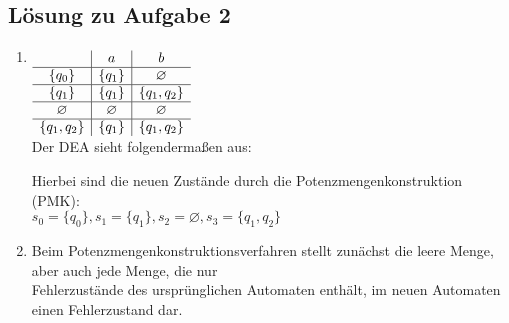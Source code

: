 \documentclass[10pt,oneside,onecolumn,a4paper,german,titlepage]{article}
\begin{document}
\subsection*{Lösung zu Aufgabe 2}
\begin{enumerate}
\item
$\begin{array}[t]{c|c|c}
& a & b \\
\hline
\{q_0\} & \{q_1\} & \varnothing \\
\hline
\{q_1\} & \{q_1\} & \{q_1,q_2\} \\
\hline
\varnothing & \varnothing & \varnothing \\
\hline
\{q_1,q_2\} & \{q_1\} & \{q_1,q_2\}
\end{array}$\\[4pt]
Der DEA sieht folgendermaßen aus:
\begin{center}
\end{center}
Hierbei sind die neuen Zustände durch die Potenzmengenkonstruktion (PMK):\\
$s_0 = \{q_0\}, s_1 = \{q_1\}, s_2 = \varnothing, s_3 = \{q_1,q_2\}$
\item Beim Potenzmengenkonstruktionsverfahren stellt zunächst die leere Menge,
aber auch jede Menge, die nur\\
Fehlerzustände des ursprünglichen Automaten enthält, im neuen Automaten einen
Fehlerzustand dar.
\end{enumerate}

\newpage
\end{document}
